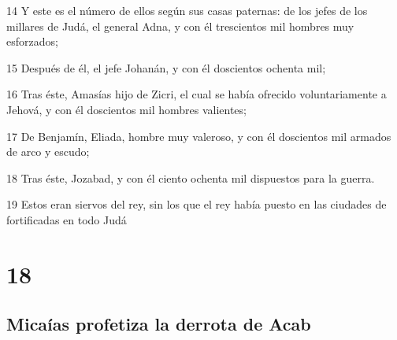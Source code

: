 \par 14 Y este es el número de ellos según sus casas paternas:  de los jefes de los millares de Judá, el general Adna, y con él trescientos mil hombres muy esforzados;
\par 15  Después de él, el jefe Johanán, y con él doscientos ochenta mil;
\par 16 Tras éste, Amasías hijo de Zicri, el cual se había ofrecido voluntariamente a Jehová, y con él doscientos mil hombres valientes;
\par 17 De Benjamín, Eliada, hombre muy valeroso, y con él doscientos mil armados de arco y escudo;
\par 18 Tras éste, Jozabad, y con él ciento ochenta mil dispuestos para la guerra.
\par 19 Estos eran siervos del rey, sin los que el rey había puesto en las ciudades de fortificadas en todo Judá

\chapter{18}

\section*{Micaías profetiza la derrota de Acab}

